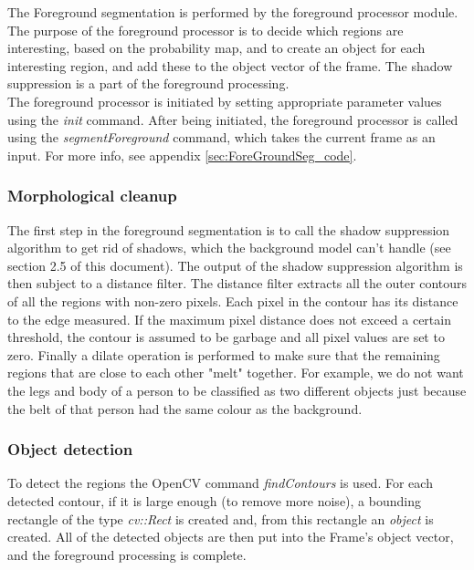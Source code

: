 The Foreground segmentation is performed by the foreground processor module. The purpose of the foreground processor is to decide which regions are interesting, based on the probability map, and to create an object for each interesting region, and add these to the object vector of the frame. The shadow suppression is a part of the foreground processing. \\
\newline
The foreground processor is initiated by setting appropriate parameter values using the \emph{init} command. After being initiated, the foreground processor is called using the \emph{segmentForeground} command, which takes the current frame as an input. For more info, see appendix \ref{sec:ForeGroundSeg_code}.

\subsubsection{Morphological cleanup}
The first step in the foreground segmentation is to call the shadow suppression algorithm to get rid of shadows, which the background model can't handle (see section 2.5 of this document). The output of the shadow suppression algorithm is then subject to a distance filter. The distance filter extracts all the outer contours of all the regions with non-zero pixels. Each pixel in the contour has its distance to the edge measured. If the maximum pixel distance does not exceed a certain threshold, the contour is assumed to be garbage and all pixel values are set to zero. Finally a dilate operation is performed to make sure that the remaining regions that are close to each other "melt" together. For example, we do not want the legs and body of a person to be classified as two different objects just because the belt of that person had the same colour as the background. 


\subsubsection{Object detection}
To detect the regions the OpenCV command \emph{findContours} is used. For each detected contour, if it is large enough (to remove more noise), a bounding rectangle of the type \emph{cv::Rect} is created and, from this rectangle an \emph{object} is created. All of the detected objects are then put into the Frame's object vector, and the foreground processing is complete.